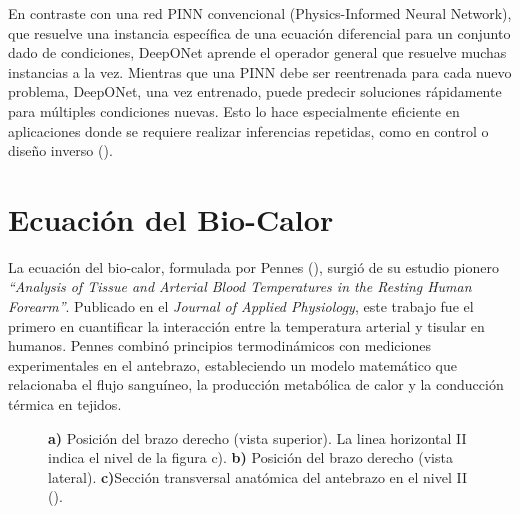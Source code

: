 \documentclass[
  spanish,
  us-letterpaper,
  DIV=11,
  numbers=noendperiod]{scrreprt}
\begin{document}
En contraste con una red PINN convencional (Physics-Informed Neural
Network), que resuelve una instancia específica de una ecuación
diferencial para un conjunto dado de condiciones, DeepONet aprende el
operador general que resuelve muchas instancias a la vez. Mientras que
una PINN debe ser reentrenada para cada nuevo problema, DeepONet, una
vez entrenado, puede predecir soluciones rápidamente para múltiples
condiciones nuevas. Esto lo hace especialmente eficiente en aplicaciones
donde se requiere realizar inferencias repetidas, como en control o
diseño inverso ().

\part{Ecuación del Bio-Calor}

La ecuación del bio-calor, formulada por Pennes
(), surgió de su estudio pionero
\emph{``Analysis of Tissue and Arterial Blood Temperatures in the
Resting Human Forearm''}. Publicado en el \emph{Journal of Applied
Physiology}, este trabajo fue el primero en cuantificar la interacción
entre la temperatura arterial y tisular en humanos. Pennes combinó
principios termodinámicos con mediciones experimentales en el antebrazo,
estableciendo un modelo matemático que relacionaba el flujo sanguíneo,
la producción metabólica de calor y la conducción térmica en tejidos.

\begin{figure}


\caption{\label{fig-pennes_art}\textbf{a)} Posición del brazo derecho
(vista superior). La linea horizontal II indica el nivel de la figura
c). \textbf{b)} Posición del brazo derecho (vista lateral).
\textbf{c)}Sección transversal anatómica del antebrazo en el nivel II
().}

\end{figure}%
\end{document}

